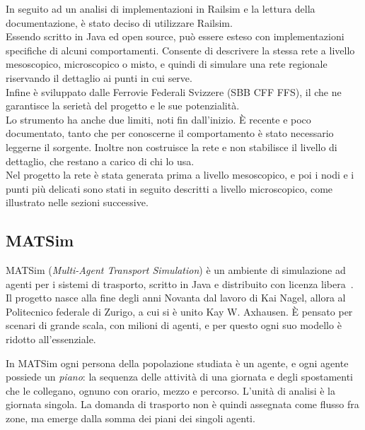 In seguito ad un analisi di implementazioni in Railsim e la lettura della documentazione, è stato deciso di utilizzare Railsim. \\
Essendo scritto in Java ed open source, può essere esteso con implementazioni specifiche di alcuni comportamenti. Consente di descrivere la stessa rete a livello mesoscopico, microscopico o misto, e quindi di simulare una rete regionale riservando il dettaglio ai punti in cui serve. \\
Infine è sviluppato dalle Ferrovie Federali Svizzere (SBB CFF FFS), il che ne garantisce la serietà del progetto e le sue potenzialità.\\

Lo strumento ha anche due limiti, noti fin dall'inizio. È recente e poco documentato, tanto che per conoscerne il comportamento è stato necessario leggerne il sorgente. Inoltre non costruisce la rete e non stabilisce il livello di dettaglio, che restano a carico di chi lo usa.\\
Nel progetto la rete è stata generata prima a livello mesoscopico, e poi i nodi e i punti più delicati sono stati in seguito descritti a livello microscopico, come illustrato nelle sezioni successive.

\subsection{MATSim}
MATSim (\textit{Multi-Agent Transport Simulation}) è un ambiente di simulazione ad agenti per i sistemi di trasporto, scritto in Java e distribuito con licenza libera~\cite{horni2016matsim}. Il progetto nasce alla fine degli anni Novanta dal lavoro di Kai Nagel, allora al Politecnico federale di Zurigo, a cui si è unito Kay W. Axhausen. È pensato per scenari di grande scala, con milioni di agenti, e per questo ogni suo modello è ridotto all'essenziale.

In MATSim ogni persona della popolazione studiata è un agente, e ogni agente possiede un \textit{piano}: la sequenza delle attività di una giornata e degli spostamenti che le collegano, ognuno con orario, mezzo e percorso. L'unità di analisi è la giornata singola. La domanda di trasporto non è quindi assegnata come flusso fra zone, ma emerge dalla somma dei piani dei singoli agenti.

